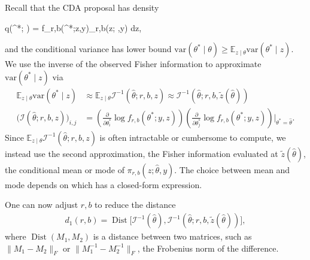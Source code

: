 \documentclass[twoside,11pt]{article}
\newcommand{\be}{\begin{equs}}
\newcommand{\ee}{\end{equs}}
\newcommand{\mc}[1]{\mathcal{#1}}
\DeclareMathOperator{\Dist}{Dist}
\newcommand{\1}{\mathbf 1}
\begin{document}
{Recall that the CDA proposal has density 
\be
q(\theta^*; \theta) = \int f_{r,b}(\theta^*;z,y)\pi_{r,b}(z; \theta,y) dz,
\ee
and the conditional variance has lower bound $\mbox{var}(\theta^*\mid \theta)\ge \mathbb{E}_{z\mid \theta} \mbox{var}(\theta^*\mid z)$. We use the inverse of the observed Fisher information to approximate $\mbox{var}(\theta^*\mid z)$ via 
\begin{equation*}
	\begin{aligned}
	 \mathbb{E}_{z\mid \theta}\mbox{var}(\theta^*\mid z) &\approx   \mathbb{E}_{z\mid \theta} \mc I^{-1}({\hat\theta};r,b,z) 
	 \approx \mc I^{-1}({\hat\theta};r,b,\tilde z(\hat\theta))	 \\
     \bigg(  \mc I({\hat\theta};r,b,z) \bigg)_{i,j}& =  \left( \frac{\partial}{\partial \theta^*_i} \log f_{r,b}(\theta^*;y,z) \right)\left( \frac{\partial}{\partial \theta^*_j} \log f_{r,b}(\theta^*;y,z) \right) \bigg\vert _{\theta^*=\hat\theta}.
	\end{aligned}
\end{equation*}
Since $\mathbb{E}_{z\mid \theta} \mathcal{I}^{-1}({\hat\theta};r,b,z)$ is often intractable or cumbersome to compute, we instead use the second approximation, the Fisher information evaluated at $\tilde z(\hat\theta)$, the conditional mean or mode of $\pi_{r,b}(z;\hat\theta,y)$. The choice between mean and mode depends on which has a closed-form expression.

One can now adjust $r,b$ to reduce the distance
\begin{equation}
\label{variance_dist}
	\begin{aligned}
    d_1(r,b)= \Dist \bigg[\mc I^{-1}(\hat \theta), \mc I^{-1}({\hat\theta};r,b,\tilde z(\hat\theta)) \bigg],
	\end{aligned}
\end{equation}
where $\Dist(M_1,M_2)$ is a distance between two matrices, such as $\|M_1-M_2\|_F$ or $\|M_1^{-1}-M_2^{-1}\|_F$, the Frobenius norm of the difference.

}
\end{document}

